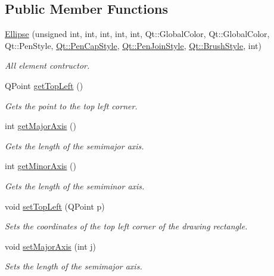 \subsection*{Public Member Functions}
\begin{DoxyCompactItemize}
\item 
\hyperlink{classEllipse_a76a451f8817fbfb5cd750621e3548cf7}{Ellipse} (unsigned int, int, int, int, int, Qt\+::\+Global\+Color, Qt\+::\+Global\+Color, Qt\+::\+Pen\+Style, \hyperlink{shape__input__file__specs_8txt_a622efdcfef6789d4367974d2fe79019e}{Qt\+::\+Pen\+Cap\+Style}, \hyperlink{shape__input__file__specs_8txt_a007db2043c6063881de2043c05c9c4a9}{Qt\+::\+Pen\+Join\+Style}, \hyperlink{shape__input__file__specs_8txt_ad07f6fe6c28dcb0b3bdc324a72d0051f}{Qt\+::\+Brush\+Style}, int)
\begin{DoxyCompactList}\small\item\em All element contructor. \end{DoxyCompactList}\item 
Q\+Point \hyperlink{classEllipse_a8d67061c0516c89e5bbcd17e1b2b22c9}{get\+Top\+Left} ()
\begin{DoxyCompactList}\small\item\em Gets the point to the top left corner. \end{DoxyCompactList}\item 
int \hyperlink{classEllipse_a4cb6a9a3ef286098d0ab36f8fecb2091}{get\+Major\+Axis} ()
\begin{DoxyCompactList}\small\item\em Gets the length of the semimajor axis. \end{DoxyCompactList}\item 
int \hyperlink{classEllipse_aa8d0c595dfee2a27dd3f44caf8f398b1}{get\+Minor\+Axis} ()
\begin{DoxyCompactList}\small\item\em Gets the length of the semiminor axis. \end{DoxyCompactList}\item 
void \hyperlink{classEllipse_a29a934608fd3cad24c5f6de9d9abb9c4}{set\+Top\+Left} (Q\+Point p)
\begin{DoxyCompactList}\small\item\em Sets the coordinates of the top left corner of the drawing rectangle. \end{DoxyCompactList}\item 
void \hyperlink{classEllipse_a0418b6a8b64b02d3f31c0389a0c6371f}{set\+Major\+Axis} (int j)
\begin{DoxyCompactList}\small\item\em Sets the length of the semimajor axis. \end{DoxyCompactList}\item 

\end{DoxyCompactItemize}
